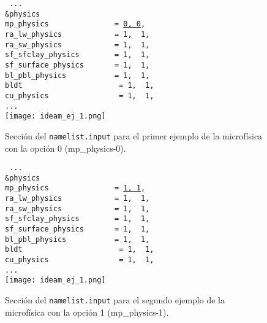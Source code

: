 \begin{itemize}
\begin{figure}[H]
\center
\texttt{
...\\
\&physics\\
mp\_physics~~~~~~~~~~~~~~~=~\underline{0,~0},\\
ra\_lw\_physics~~~~~~~~~~~~=~1,~~1,\\
ra\_sw\_physics~~~~~~~~~~~~=~1,~~1,\\
sf\_sfclay\_physics~~~~~~~~=~1,~~1,\\
sf\_surface\_physics~~~~~~~=~1,~~1,\\
bl\_pbl\_physics~~~~~~~~~~~=~1,~~1,\\
bldt~~~~~~~~~~~~~~~~~~~~~~=~1,~~1,\\
cu\_physics~~~~~~~~~~~~~~~~=~1,~~1,\\
...\\
}
\centering
\texttt{[image: ideam\_ej\_1.png]}
\caption{Sección del \texttt{namelist.input} para el primer ejemplo de la microfísica con la opción 0 (mp\_physics-0).}
\label{imag_tab_ej2}

\end{figure}



\begin{figure}[H]

\center
\texttt{
...\\
\&physics\\
mp\_physics~~~~~~~~~~~~~~~=~\underline{1,~1},\\
ra\_lw\_physics~~~~~~~~~~~~=~1,~~1,\\
ra\_sw\_physics~~~~~~~~~~~~=~1,~~1,\\
sf\_sfclay\_physics~~~~~~~~=~1,~~1,\\
sf\_surface\_physics~~~~~~~=~1,~~1,\\
bl\_pbl\_physics~~~~~~~~~~~=~1,~~1,\\
bldt~~~~~~~~~~~~~~~~~~~~~~=~1,~~1,\\
cu\_physics~~~~~~~~~~~~~~~~=~1,~~1,\\
...\\
}
\centering
\texttt{[image: ideam\_ej\_1.png]}
\caption{Sección del \texttt{namelist.input} para el segundo ejemplo de la microfísica con la opción 1 (mp\_physics-1).}
\label{imag_tab_ej3}


\end{figure}


\begin{figure}[H]


\end{figure}
\end{itemize}
